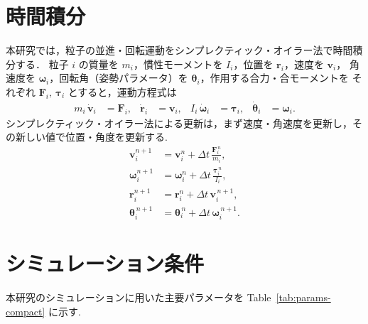 \documentclass[a4paper,10pt,twocolumn]{ltjsarticle}
\newcommand{\refTab}[1]{Table~\ref{#1}}
\begin{document}
\section{時間積分}
本研究では，粒子の並進・回転運動をシンプレクティック・オイラー法で時間積分する．
粒子 $i$ の質量を $m_i$，慣性モーメントを $I_i$，位置を $\bm r_i$，速度を $\bm v_i$，
角速度を $\bm\omega_i$，回転角（姿勢パラメータ）を $\bm\theta_i$，作用する合力・合モーメントを
それぞれ $\bm F_i,\ \bm\tau_i$ とすると，運動方程式は
\begin{align}
  m_i\,\dot{\bm v}_i     & = \bm F_i,      &
  \dot{\bm r}_i          & = \bm v_i,      &
  I_i\,\dot{\bm\omega}_i & = \bm\tau_i,    &
  \dot{\bm\theta}_i      & = \bm\omega_i .
\end{align}
シンプレクティック・オイラー法による更新は，まず速度・角速度を更新し，その新しい値で位置・角度を更新する.
\begin{align}
  \bm v_i^{n+1}       & = \bm v_i^{n}      + \Delta t\,\frac{\bm F_i^{\,n}}{m_i},   \\
  \bm\omega_i^{n+1}   & = \bm\omega_i^{n}  + \Delta t\,\frac{\bm\tau_i^{\,n}}{I_i}, \\
  \bm r_i^{n+1}       & = \bm r_i^{n}      + \Delta t\,\bm v_i^{\,n+1},             \\
  \bm\theta_i^{\,n+1} & = \bm\theta_i^{\,n}+ \Delta t\,\bm\omega_i^{\,n+1}.
\end{align}

\section{シミュレーション条件}
本研究のシミュレーションに用いた主要パラメータを \refTab{tab:params-compact} に示す.
\end{document}
